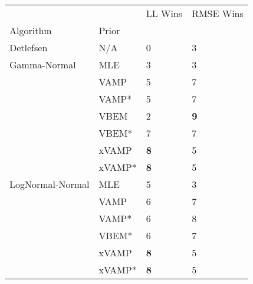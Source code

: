 \begin{tabular}{llll}
\toprule
                 &        &     LL Wins &   RMSE Wins \\
Algorithm & Prior &             &             \\
\midrule
Detlefsen & N/A &           0 &           3 \\
Gamma-Normal & MLE &           3 &           3 \\
                 & VAMP &           5 &           7 \\
                 & VAMP* &           5 &           7 \\
                 & VBEM &           2 &  \textbf{9} \\
                 & VBEM* &           7 &           7 \\
                 & xVAMP &  \textbf{8} &           5 \\
                 & xVAMP* &  \textbf{8} &           5 \\
LogNormal-Normal & MLE &           5 &           3 \\
                 & VAMP &           6 &           7 \\
                 & VAMP* &           6 &           8 \\
                 & VBEM* &           6 &           7 \\
                 & xVAMP &  \textbf{8} &           5 \\
                 & xVAMP* &  \textbf{8} &           5 \\
\bottomrule
\end{tabular}

